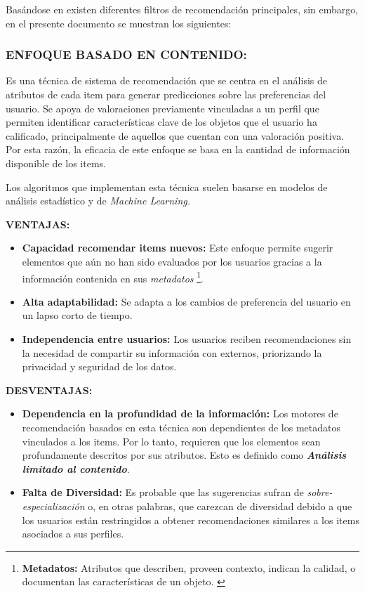 Basándose en \parencite{ISINKAYE2015261} existen diferentes filtros de recomendación principales, sin embargo, en el presente documento se muestran los siguientes: 

\subsubsection{ENFOQUE BASADO EN CONTENIDO: }
Es una técnica de sistema de recomendación que se centra en el análisis de atributos de cada item para generar predicciones sobre las preferencias del usuario. Se apoya de valoraciones previamente vinculadas a un perfil que permiten identificar características clave de los objetos que el usuario ha calificado, principalmente de aquellos que cuentan con una valoración positiva.  Por esta razón, la eficacia de este enfoque se basa en la cantidad de información disponible de los items.

Los algoritmos que implementan esta técnica suelen basarse en modelos de análisis estadístico y de \textit{Machine Learning.}

\textbf{VENTAJAS: }
\begin{itemize}

    \item \textbf{Capacidad recomendar items nuevos: } Este enfoque permite sugerir elementos que aún no han sido evaluados por los usuarios gracias a la información contenida en sus \textit{metadatos} \footnote{\textbf{Metadatos: } Atributos que describen, proveen contexto, indican la calidad, o documentan las características de un objeto. \parencite{Greenberg09092005}}.
    \item \textbf{Alta adaptabilidad: } Se adapta a los cambios de preferencia del usuario en un lapso corto de tiempo.

    \item \textbf{Independencia entre usuarios: } Los usuarios reciben recomendaciones sin la necesidad de compartir su información con externos, priorizando la privacidad y seguridad de los datos.
    
\end{itemize}

\newpage
\thispagestyle{plain}
\vspace*{0.2cm}

\textbf{DESVENTAJAS: }
\begin{itemize}

    \item \textbf{Dependencia en la profundidad de la información: } Los motores de recomendación basados en esta técnica son dependientes de los metadatos vinculados a los items. Por lo tanto, requieren que los elementos sean profundamente descritos por sus atributos. Esto es definido como \textbf{\textit{Análisis limitado al contenido}}.
    
    \item \textbf{Falta de Diversidad: } Es probable que las sugerencias sufran de \textit{sobre-especialización} o, en otras palabras, que carezcan de diversidad debido a que los usuarios están restringidos a obtener recomendaciones similares a los items asociados a sus perfiles.
\end{itemize}

